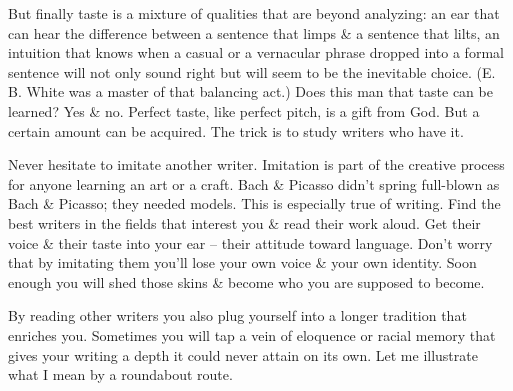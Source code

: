\documentclass{article}
\numberwithin{equation}{section}
\begin{document}
But finally taste is a mixture of qualities that are beyond analyzing: an ear that can hear the difference between a sentence that limps \& a sentence that lilts, an intuition that knows when a casual or a vernacular phrase dropped into a formal sentence will not only sound right but will seem to be the inevitable choice. (E. B. White was a master of that balancing act.) Does this man that taste can be learned? Yes \& no. Perfect taste, like perfect pitch, is a gift from God. But a certain amount can be acquired. The trick is to study writers who have it.

Never hesitate to imitate another writer. Imitation is part of the creative process for anyone learning an art or a craft. Bach \& Picasso didn't spring full-blown as Bach \& Picasso; they needed models. This is especially true of writing. Find the best writers in the fields that interest you \& read their work aloud. Get their voice \& their taste into your ear -- their attitude toward language. Don't worry that by imitating them you'll lose your own voice \& your own identity. Soon enough you will shed those skins \& become who you are supposed to become.

By reading other writers you also plug yourself into a longer tradition that enriches you. Sometimes you will tap a vein of eloquence or racial memory that gives your writing a depth it could never attain on its own. Let me illustrate what I mean by a roundabout route.
\end{document}
